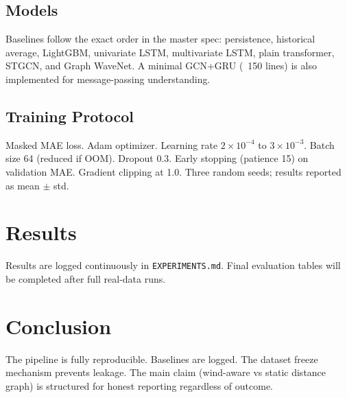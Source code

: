 \documentclass[11pt,a4paper]{article}
\begin{document}
\subsection{Models}
Baselines follow the exact order in the master spec: persistence, historical average, LightGBM, univariate LSTM, multivariate LSTM, plain transformer, STGCN, and Graph WaveNet. A minimal GCN+GRU (~150 lines) is also implemented for message-passing understanding.

\subsection{Training Protocol}
Masked MAE loss. Adam optimizer. Learning rate $2 \times 10^{-4}$ to $3 \times 10^{-3}$. Batch size 64 (reduced if OOM). Dropout 0.3. Early stopping (patience 15) on validation MAE. Gradient clipping at 1.0. Three random seeds; results reported as mean $\pm$ std.

\section{Results}

Results are logged continuously in \texttt{EXPERIMENTS.md}. Final evaluation tables will be completed after full real-data runs.

\section{Conclusion}

The pipeline is fully reproducible. Baselines are logged. The dataset freeze mechanism prevents leakage. The main claim (wind-aware vs static distance graph) is structured for honest reporting regardless of outcome.
\end{document}
